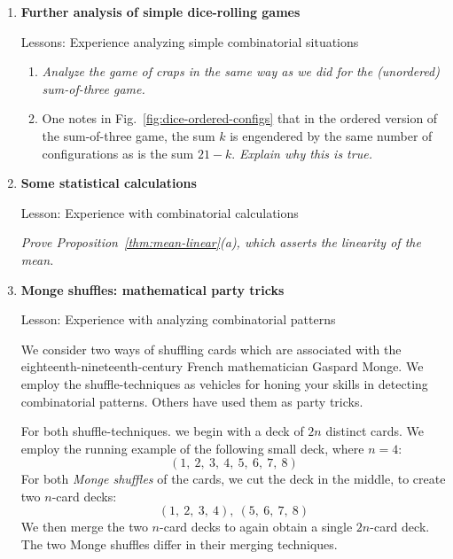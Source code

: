 \begin{enumerate}

\medskip\item
{\bf Further analysis of simple dice-rolling games}

{\sc Lessons:} Experience analyzing simple combinatorial situations

\smallskip

  \begin{enumerate}
  \item
{\em Analyze the game of craps in the same way as we did for the (unordered) sum-of-three game.}

  \medskip\item
One notes in Fig.~\ref{fig:dice-ordered-configs} that in the ordered version of the sum-of-three game, the sum $k$ is engendered by the same number of configurations as is the sum $21 - k$.  
{\em Explain why this is true.}
  \end{enumerate}
  

\smallskip
\medskip\item
{\bf Some statistical calculations}

{\sc Lesson:} Experience with combinatorial calculations

\smallskip
  
{\em Prove Proposition~\ref{thm:mean-linear}(a), which asserts the linearity of the mean.}


\medskip\item
{\bf Monge shuffles: mathematical party tricks}

{\sc Lesson:} Experience with analyzing combinatorial patterns

\smallskip

 

We consider two ways of shuffling cards which are associated with the eighteenth-nineteenth-century French mathematician Gaspard Monge.  We employ the shuffle-techniques as vehicles for honing your skills in detecting combinatorial patterns.  Others have used them as party tricks.

\smallskip

For both shuffle-techniques. we begin with a deck of $2n$ distinct cards.  We employ the running example of the following small deck, where $n=4$:
\[ (1, \ 2, \ 3, \ 4, \ 5, \ 6, \ 7, \ 8) \]
For both {\it Monge shuffles} of the cards, we cut the deck in the middle, to create two $n$-card decks:
\[ (1, \ 2, \ 3, \ 4), \ (5, \ 6, \ 7, \ 8) \]
We then merge the two $n$-card decks to again obtain a single $2n$-card deck.  The two Monge shuffles differ in their merging techniques.


\end{enumerate}
